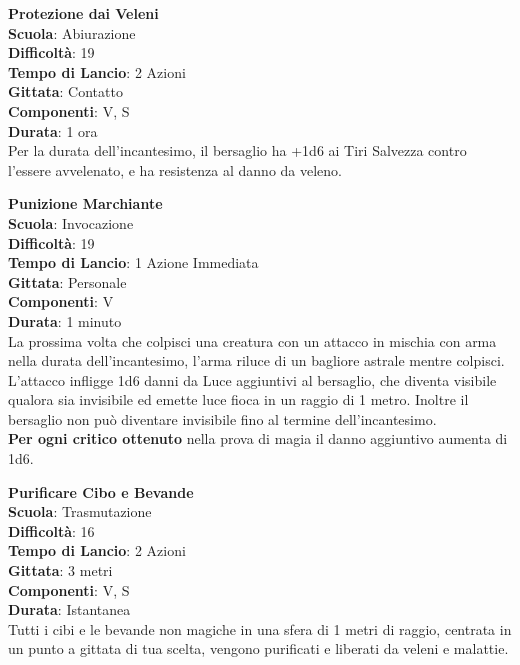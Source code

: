 \begin{multicols}{2}
\medskip\textbf{Protezione dai Veleni}\\
\textbf{Scuola}: Abiurazione\\
\textbf{Difficoltà}: 19\\
\textbf{Tempo di Lancio}: 2 Azioni\\
\textbf{Gittata}: Contatto\\
\textbf{Componenti}: V, S\\
\textbf{Durata}: 1 ora\\
Per la durata dell'incantesimo, il bersaglio ha +1d6 ai Tiri Salvezza contro l'essere avvelenato, e ha resistenza al danno da veleno.

\medskip\textbf{Punizione Marchiante}\\
\textbf{Scuola}: Invocazione\\
\textbf{Difficoltà}: 19\\
\textbf{Tempo di Lancio}: 1 Azione Immediata\\
\textbf{Gittata}: Personale\\
\textbf{Componenti}: V\\
\textbf{Durata}: 1 minuto\\
La prossima volta che colpisci una creatura con un attacco in mischia con arma nella durata dell'incantesimo, l'arma riluce di un bagliore astrale mentre colpisci. L'attacco infligge 1d6 danni da Luce aggiuntivi al bersaglio, che diventa visibile qualora sia invisibile ed emette luce fioca in un raggio di 1 metro. Inoltre il bersaglio non può diventare invisibile fino al termine dell'incantesimo. \\
\textbf{Per ogni critico ottenuto} nella prova di magia il danno aggiuntivo aumenta di 1d6.

\medskip\textbf{Purificare Cibo e Bevande}\\
\textbf{Scuola}: Trasmutazione\\
\textbf{Difficoltà}: 16\\
\textbf{Tempo di Lancio}: 2 Azioni\\
\textbf{Gittata}: 3 metri\\
\textbf{Componenti}: V, S\\
\textbf{Durata}: Istantanea\\
Tutti i cibi e le bevande non magiche in una sfera di 1 metri di raggio, centrata in un punto a gittata di tua scelta, vengono purificati e liberati da veleni e malattie. 


\end{multicols}
